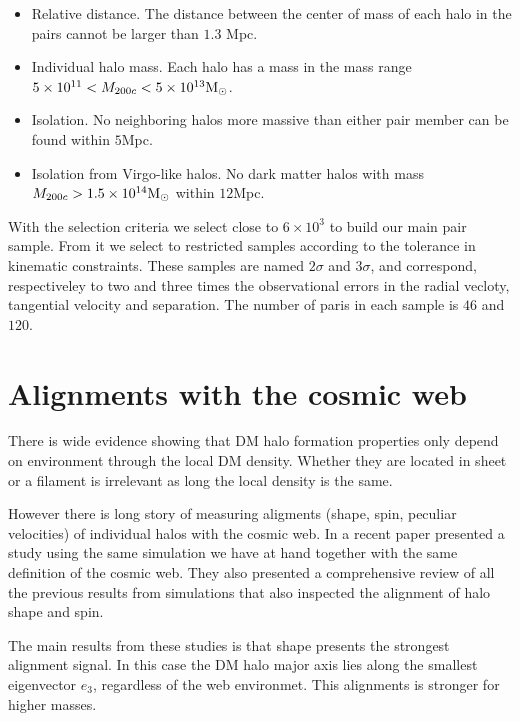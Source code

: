 \documentclass{iau}
\newcommand{\Msun}{{\ifmmode{{\rm {M_{\odot}}}}\else{${\rm{M_{\odot}}}$}\fi}}
\begin{document}
\begin{itemize}
\item Relative distance. The distance between the center of mass of
  each halo in the pairs cannot be larger than $1.3$ Mpc.
\item Individual halo mass. Each halo has a mass in the mass range
  $5\times 10^{11}<M_{200c}<5\times 10^{13}\Msun$.  
\item  Isolation. No neighboring halos more massive than either pair
member can be found within $5$Mpc.
\item Isolation from Virgo-like halos. No dark matter halos with mass
  $M_{200c}>1.5\times 10^{14}\Msun$ within $12$Mpc.
\end{itemize}

With the selection criteria we select close to $6\times 10^3$ to build
our main pair sample. From it we select to restricted samples
according to the tolerance in kinematic constraints. These samples 
are named $2\sigma$ and $3\sigma$, and correspond, respectiveley to
two and three times the observational errors in the radial vecloty,
tangential velocity and separation. The number of paris in each sample
is $46$ and $120$. 

\section{Alignments with the cosmic web}

There is wide evidence showing that DM halo formation properties only
depend on environment through the local DM density. Whether they are
located in sheet or a filament is irrelevant as long the local density
is the same. 

However there is long story of measuring aligments (shape, spin,
peculiar velocities) of individual halos with the cosmic web. In a
recent paper \cite{ForeroRomero2014} presented a study
using the same simulation we have at hand together with the same
definition of the cosmic web. They also presented a comprehensive
review of all the previous results from simulations that also
inspected the alignment of halo shape and spin. 

The main results from these studies is that shape presents the
strongest alignment signal. In this case the DM halo major axis lies
along the smallest eigenvector $e_{3}$, regardless of the web
environmet. This alignments is stronger for higher masses. 
\end{document}
